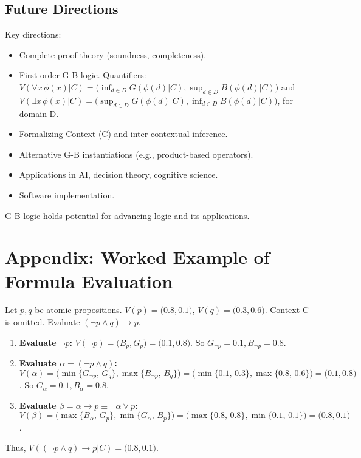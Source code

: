 \documentclass[11pt]{article}
\newcommand{\GB}[2]{\bigl(#1,#2\bigr)} %
\theoremstyle{remark}
\begin{document}
\subsection{Future Directions}
Key directions:
\begin{itemize}
    \item Complete proof theory (soundness, completeness).
    \item First-order G-B logic. Quantifiers: $V(\forall x\,\phi(x)|C) = \GB{\inf_{d \in D} G(\phi(d)|C)}{\sup_{d \in D} B(\phi(d)|C)}$ and $V(\exists x\,\phi(x)|C) = \GB{\sup_{d \in D} G(\phi(d)|C)}{\inf_{d \in D} B(\phi(d)|C)}$, for domain D.
    \item Formalizing Context (C) and inter-contextual inference.
    \item Alternative G-B instantiations (e.g., product-based operators).
    \item Applications in AI, decision theory, cognitive science.
    \item Software implementation.
\end{itemize}
G-B logic holds potential for advancing logic and its applications.

\appendix
\section{Appendix: Worked Example of Formula Evaluation} \label{appendix:worked_example}
Let $p, q$ be atomic propositions. $V(p) = \GB{0.8}{0.1}$, $V(q) = \GB{0.3}{0.6}$. Context C is omitted.
Evaluate $(\neg p \land q) \rightarrow p$.
\begin{enumerate}
    \item \textbf{Evaluate $\neg p$:} $V(\neg p) = \GB{B_p}{G_p} = \GB{0.1}{0.8}$. So $G_{\neg p} = 0.1, B_{\neg p} = 0.8$.
    \item \textbf{Evaluate $\alpha = (\neg p \land q)$:} $V(\alpha) = \GB{\min\{G_{\neg p},\,G_q\}}{\max\{B_{\neg p},\,B_q\}} = \GB{\min\{0.1,\,0.3\}}{\max\{0.8,\,0.6\}} = \GB{0.1}{0.8}$. So $G_\alpha = 0.1, B_\alpha = 0.8$.
    \item \textbf{Evaluate $\beta = \alpha \rightarrow p \equiv \neg\alpha \lor p$:} $V(\beta) = \GB{\max\{B_\alpha,\,G_p\}}{\min\{G_\alpha,\,B_p\}} = \GB{\max\{0.8,\,0.8\}}{\min\{0.1,\,0.1\}} = \GB{0.8}{0.1}$.
\end{enumerate}
Thus, $V((\neg p \land q) \rightarrow p|C) = \GB{0.8}{0.1}$.
\end{document}

